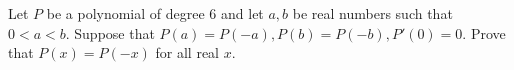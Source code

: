 Let $P$ be a polynomial of degree $6$ and let $a,b$ be real numbers such that $0<a<b$. Suppose that $P(a)=P(-a),P(b)=P(-b),P'(0)=0$. Prove that $P(x)=P(-x)$ for all real $x$.